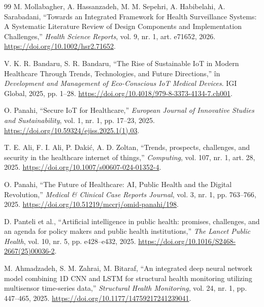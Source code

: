 \documentclass[12pt,a4paper,twoside]{article}
\begin{document}
\begin{thebibliography}{99}
 M. Mollabagher, A. Hassanzadeh, M. M. Sepehri, A. Habibelahi, A. Sarabadani, ``Towards an Integrated Framework for Health Surveillance Systems: A Systematic Literature Review of Design Components and Implementation Challenges,'' \textit{Health Science Reports}, vol. 9, nr. 1, art. e71652, 2026. \url{https://doi.org/10.1002/hsr2.71652}.

 V. K. R. Bandaru, S. R. Bandaru, ``The Rise of Sustainable IoT in Modern Healthcare Through Trends, Technologies, and Future Directions,'' în \textit{Development and Management of Eco-Conscious IoT Medical Devices}. IGI Global, 2025, pp. 1--28. \url{https://doi.org/10.4018/979-8-3373-4134-7.ch001}.

 O. Panahi, ``Secure IoT for Healthcare,'' \textit{European Journal of Innovative Studies and Sustainability}, vol. 1, nr. 1, pp. 17--23, 2025. \url{https://doi.org/10.59324/ejiss.2025.1(1).03}.

 T. E. Ali, F. I. Ali, P. Dakić, A. D. Zoltan, ``Trends, prospects, challenges, and security in the healthcare internet of things,'' \textit{Computing}, vol. 107, nr. 1, art. 28, 2025. \url{https://doi.org/10.1007/s00607-024-01352-4}.

 O. Panahi, ``The Future of Healthcare: AI, Public Health and the Digital Revolution,'' \textit{Medical \& Clinical Case Reports Journal}, vol. 3, nr. 1, pp. 763--766, 2025. \url{https://doi.org/10.51219/mccrj/omid-panahi/198}.

 D. Panteli et al., ``Artificial intelligence in public health: promises, challenges, and an agenda for policy makers and public health institutions,'' \textit{The Lancet Public Health}, vol. 10, nr. 5, pp. e428--e432, 2025. \url{https://doi.org/10.1016/S2468-2667(25)00036-2}.

 M. Ahmadzadeh, S. M. Zahrai, M. Bitaraf, ``An integrated deep neural network model combining 1D CNN and LSTM for structural health monitoring utilizing multisensor time-series data,'' \textit{Structural Health Monitoring}, vol. 24, nr. 1, pp. 447--465, 2025. \url{https://doi.org/10.1177/14759217241239041}.

\end{thebibliography}
\end{document}
